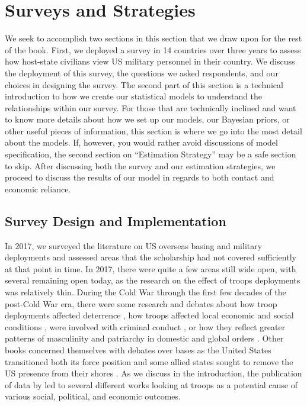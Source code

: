 
\section*{Surveys and Strategies}

We seek to accomplish two sections in this section that we draw upon for the rest of the book. First, we deployed a survey in 14 countries over three years to assess how host-state civilians view US military personnel in their country. We discuss the deployment of this survey, the questions we asked respondents, and our choices in designing the survey. The second part of this section is a technical introduction to how we create our statistical models to understand the relationships within our survey. For those that are technically inclined and want to know more details about how we set up our models, our Bayesian priors, or other useful pieces of information, this section is where we go into the most detail about the models. If, however, you would rather avoid discussions of model specification, the second section on ``Estimation Strategy'' may be a safe section to skip. After discussing both the survey and our estimation strategies, we proceed to discuss the results of our model in regards to both contact and economic reliance. 


\subsection*{Survey Design and Implementation}

In 2017, we surveyed the literature on US overseas basing and military deployments and assessed areas that the scholarship had not covered sufficiently at that point in time. In 2017, there were quite a few areas still wide open, with several remaining open today, as the research on the effect of troops deployments was relatively thin. During the Cold War through the first few decades of the post-Cold War era, there were some research and debates about how troop deployments affected deterrence \cite{Schelling1966}, how troops affected local economic and social conditions \cite{Moon1997}, were involved with criminal conduct \cite{Bryant1979}, or how they reflect greater patterns of masculinity and patriarchy in domestic and global orders \cite{Enloe1990}. Other books concerned themselves with debates over bases as the United States transitioned both its force position and some allied states sought to remove the US presence from their shores \cite{calder2007,cooley2008,Yeo2011}. As we discuss in the introduction, the publication of data by  led to several different works looking at troops as a potential cause of various social, political, and economic outcomes. 


